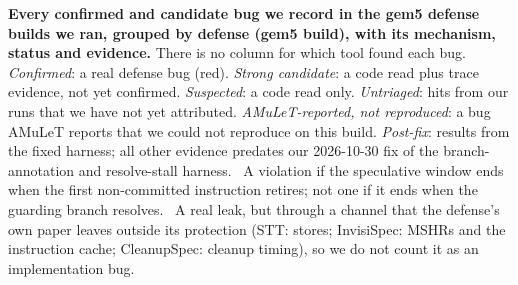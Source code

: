 \textbf{Every confirmed and candidate bug we record in the gem5 defense builds we ran, grouped by defense (gem5 build), with its mechanism, status and evidence.} There is no column for which tool found each bug. \emph{Confirmed}: a real defense bug (red). \emph{Strong candidate}: a code read plus trace evidence, not yet confirmed. \emph{Suspected}: a code read only. \emph{Untriaged}: hits from our runs that we have not yet attributed. \emph{AMuLeT-reported, not reproduced}: a bug AMuLeT reports that we could not reproduce on this build. \emph{Post-fix}: results from the fixed harness; all other evidence predates our 2026-10-30 fix of the branch-annotation and resolve-stall harness. \textdagger\ A violation if the speculative window ends when the first non-committed instruction retires; not one if it ends when the guarding branch resolves. \textdaggerdbl\ A real leak, but through a channel that the defense's own paper leaves outside its protection (STT: stores; InvisiSpec: MSHRs and the instruction cache; CleanupSpec: cleanup timing), so we do not count it as an implementation bug.
